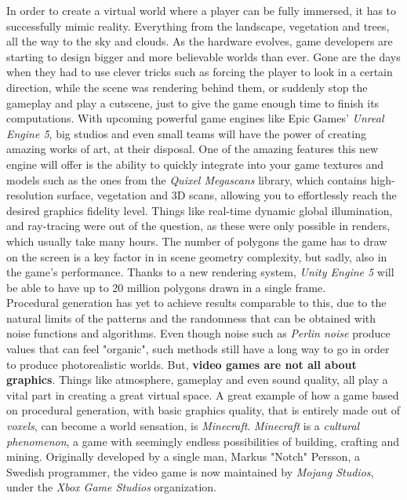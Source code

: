 In order to create a virtual world where a player can be fully immersed, it has to successfully mimic reality. Everything from the landscape, vegetation and trees, all the way to the sky and clouds. As the hardware evolves, game developers are starting to design bigger and more believable worlds than ever. Gone are the days when they had to use clever tricks such as forcing the player to look in a certain direction, while the scene was rendering behind them, or suddenly stop the gameplay and play a cutscene, just to give the game enough time to finish its computations. With upcoming powerful game engines like Epic Games' \textit{Unreal Engine 5}, big studios and even small teams will have the power of creating amazing works of art, at their disposal. One of the amazing features this new engine will offer is the ability to quickly integrate into your game textures and models such as the ones from the \textit{Quixel Megascans} library\cite{megascans}, which contains high-resolution surface, vegetation and 3D scans, allowing you to effortlessly reach the desired graphics fidelity level. Things like real-time dynamic global illumination, and ray-tracing were out of the question, as these were only possible in renders, which usually take many hours. The number of polygons the game has to draw on the screen is a key factor in in scene geometry complexity, but sadly, also in the game's performance. Thanks to a new rendering system, \textit{Unity Engine 5} will be able to have up to 20 million polygons drawn in a single frame\cite{ue5}.\\

Procedural generation has yet to achieve results comparable to this, due to the natural limits of the patterns and the randomness that can be obtained with noise functions and algorithms. Even though noise such as \textit{Perlin noise} produce values that can feel "organic", such methods still have a long way to go in order to produce photorealistic worlds. But, \textbf{video games are not all about graphics}. Things like atmosphere, gameplay and even sound quality, all play a vital part in creating a great virtual space. A great example of how a game based on procedural generation, with basic graphics quality, that is entirely made out of \textit{voxels}, can become a world sensation, is \textit{Minecraft}\cite{minecraft}. \textit{Minecraft} is a \textit{cultural phenomenon}, a game with seemingly endless possibilities of building, crafting and mining. Originally developed by a single man, Markus "Notch" Persson, a Swedish programmer, the video game is now maintained by \textit{Mojang Studios}, under the \textit{Xbox Game Studios} organization.\\

